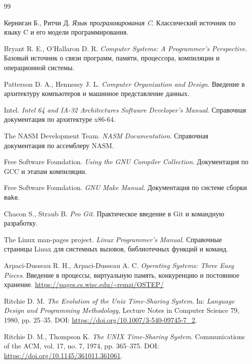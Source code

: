 \renewcommand{\bibname}{Используемая литература}

\begin{thebibliography}{99}

Керниган Б., Ритчи Д. \textit{Язык программирования C}. Классический источник по языку C и его модели программирования.

Bryant R. E., O'Hallaron D. R. \textit{Computer Systems: A Programmer's Perspective}. Базовый источник о связи программ, памяти, процессора, компиляции и операционной системы.

Patterson D. A., Hennessy J. L. \textit{Computer Organization and Design}. Введение в архитектуру компьютеров и машинное представление данных.

Intel. \textit{Intel 64 and IA-32 Architectures Software Developer's Manual}. Справочная документация по архитектуре x86-64.

The NASM Development Team. \textit{NASM Documentation}. Справочная документация по ассемблеру NASM.

Free Software Foundation. \textit{Using the GNU Compiler Collection}. Документация по GCC и этапам компиляции.

Free Software Foundation. \textit{GNU Make Manual}. Документация по системе сборки \texttt{make}.

Chacon S., Straub B. \textit{Pro Git}. Практическое введение в Git и командную разработку.

The Linux man-pages project. \textit{Linux Programmer's Manual}. Справочные страницы Linux для системных вызовов, библиотечных функций и команд.

Arpaci-Dusseau R. H., Arpaci-Dusseau A. C. \textit{Operating Systems: Three Easy Pieces}.
Введение в процессы, виртуальную память, конкуренцию и постоянное хранение.
\url{https://pages.cs.wisc.edu/~remzi/OSTEP/}

Ritchie D. M. \textit{The Evolution of the Unix Time-Sharing System}.
In: \textit{Language Design and Programming Methodology}, Lecture Notes in
Computer Science 79, 1980, pp. 25--35. DOI: \url{https://doi.org/10.1007/3-540-09745-7_2}.

Ritchie D. M., Thompson K. \textit{The UNIX Time-Sharing System}.
Communications of the ACM, vol. 17, no. 7, 1974, pp. 365--375.
DOI: \url{https://doi.org/10.1145/361011.361061}.


\end{thebibliography}
